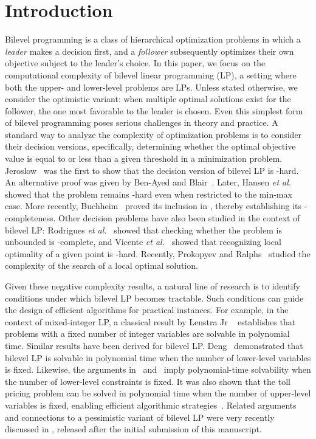 \documentclass[runningheads,orivec]{llncs}
\newcommand{\EtAl}{\textit{et al.}}
\newcommand{\MacroColor}[1]{#1}
\newcommand{\ComplexityClassStyle}[1]{#1}
\newcommand{\ClassNP}{\MacroColor{\text{\ComplexityClassStyle{NP}}}}
\begin{document}
\section{Introduction}

Bilevel programming is a class of hierarchical optimization problems in which a \emph{leader} makes a decision first, and a \emph{follower} subsequently optimizes their own objective subject to the leader's choice. 
In this paper, we focus on the computational complexity of bilevel linear programming (LP), a setting where both the upper- and lower-level problems are LPs.
Unless stated otherwise, we consider the optimistic variant: when multiple optimal solutions exist for the follower, the one most favorable to the leader is chosen.
Even this simplest form of bilevel programming poses serious challenges in theory and practice.
A standard way to analyze the complexity of optimization problems is to consider their decision versions, specifically, determining whether the optimal objective value is equal to or less than a given threshold in a minimization problem.
Jeroslow~\cite{Jeroslow1985} was the first to show that the decision version of bilevel LP is \ClassNP{}-hard.
An alternative proof was given by Ben-Ayed and Blair~\cite{ben1990computational}.
Later, Hansen \EtAl{}~\cite{hansen1992new} showed that the problem remains \ClassNP{}-hard even when restricted to the min-max case.
More recently, Buchheim~\cite{Buchheim2023} proved its inclusion in \ClassNP{}, thereby establishing its \ClassNP{}-completeness.
Other decision problems have also been studied in the context of bilevel LP: Rodrigues \EtAl{}~\cite{RodriguesEtAl2024} showed that checking whether the problem is unbounded is \ClassNP{}-complete, and Vicente \EtAl{}~\cite{vicente1994descent} showed that recognizing local optimality of a given point is \ClassNP{}-hard.
Recently, Prokopyev and Ralphs~\cite{ProkopyevRalphs2024} studied the complexity of the search of a local optimal solution.

Given these negative complexity results, a natural line of research is to identify conditions under which bilevel LP becomes tractable. 
Such conditions can guide the design of efficient algorithms for practical instances.
For example, in the context of mixed-integer LP, a classical result by Lenstra Jr ~\cite{lenstra1983integer} establishes that problems with a fixed number of integer variables are solvable in polynomial time.
Similar results have been derived for bilevel LP.
Deng~\cite{deng1998complexity} demonstrated that bilevel LP is solvable in polynomial time when the number of lower-level variables is fixed.
Likewise, the arguments in~\cite{BasuEtAl2021} and~\cite{Buchheim2023} imply polynomial-time solvability when the number of lower-level constraints is fixed.
It was also shown that the toll pricing problem can be solved in polynomial time when the number of upper-level variables is fixed, enabling efficient algorithmic strategies~\cite{bui2024asymmetry}.
Related arguments and connections to a pessimistic variant of bilevel LP were very recently discussed in \cite{ketkov2025note}, released after the initial submission of this manuscript.
\end{document}
